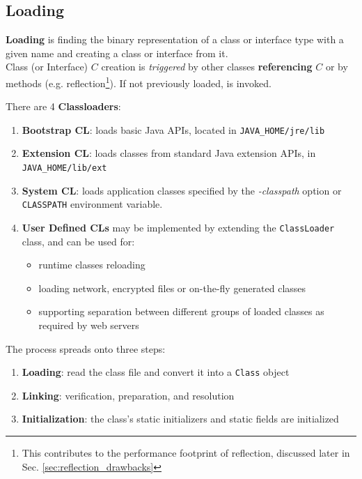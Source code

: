 \subsection{Loading}
\textbf{Loading} is finding the binary representation of a class or interface type with a given name and creating a class or interface from it.\\
Class (or Interface) $C$ creation is \textit{triggered} by other classes \textbf{referencing} $C$ or by methods (e.g. reflection\footnote{This contributes to the performance footprint of reflection, discussed later in Sec. \ref{sec:reflection_drawbacks}}).
If not previously loaded,  is invoked.
\nl

{There are 4 \textbf{Classloaders}:\ns
\begin{enumerate}
    \item \textbf{Bootstrap CL}: loads basic Java APIs, located in \texttt{JAVA\_HOME/jre/lib}
    \item \textbf{Extension CL}: loads classes from standard Java extension APIs, in \texttt{JAVA\_HOME/lib/ext}
    \item \textbf{System CL}: loads application classes specified by the \textit{-classpath} option or \texttt{CLASSPATH} environment variable.
    \item \textbf{User Defined CLs} may be implemented by extending the \lstinline|ClassLoader| class, and can be used for:
    \begin{itemize}
        \item runtime classes reloading
        \item loading network, encrypted files or on-the-fly generated classes
        \item supporting separation between different groups of loaded classes as required by web servers
    \end{itemize}
\end{enumerate}}

{The process spreads onto three steps:\ns
\begin{enumerate}
    \item \textbf{Loading}: read the class file and convert it into a \lstinline|Class| object
    \item \textbf{Linking}: verification, preparation, and resolution
    \item \textbf{Initialization}: the class's static initializers and static fields are initialized
\end{enumerate}}

